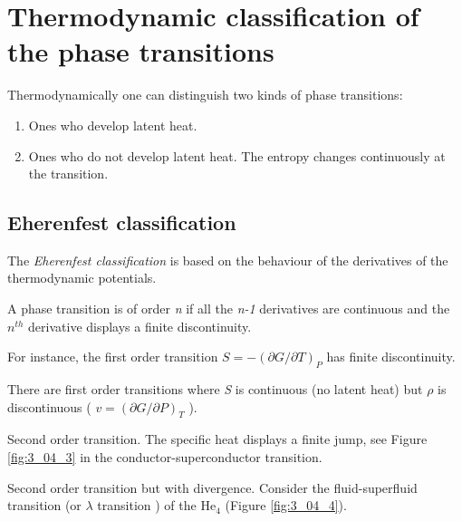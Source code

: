 \documentclass[../main/main.tex]{subfiles}
\begin{document}
\section{Thermodynamic classification of the phase transitions}
Thermodynamically one can distinguish two kinds of phase transitions:
\begin{enumerate}
\item Ones who develop latent heat.
\item Ones who do not develop latent heat. The entropy changes continuously at the transition.
\end{enumerate}
\subsection{Eherenfest classification}
The \emph{Eherenfest classification} is based on the behaviour of the derivatives of the thermodynamic potentials.

A phase transition is of order \emph{n} if all the \emph{n-1} derivatives are continuous and the \( n^{th} \) derivative displays a finite discontinuity.
\begin{example}
For instance, the first order transition \( S=-(\partial{G}/\partial{T}  )_P \) has finite discontinuity.
\end{example}
\begin{remark}
There are first order transitions where \emph{S} is continuous (no latent heat) but \( \rho  \) is discontinuous ( \( v = (\partial{G}/\partial{P}  )_T \) ).
\end{remark}
\begin{example}
Second order transition. The specific heat displays a finite jump, see Figure \ref{fig:3_04_3} in the conductor-superconductor transition.
\end{example}
Second order transition but with divergence. Consider the fluid-superfluid transition (or \( \lambda  \) transition ) of the \( \text{He}_4 \) (Figure \ref{fig:3_04_4}).
\end{document}
